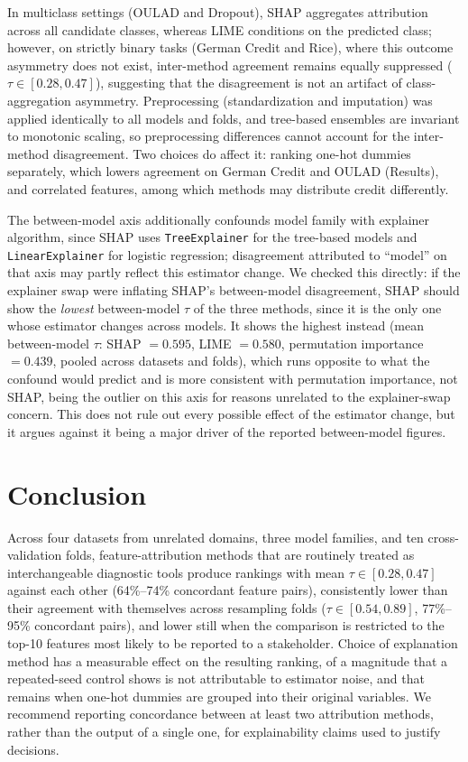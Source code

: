 \documentclass[11pt,twoside,a4paper]{article}
\begin{document}
In multiclass settings (OULAD and Dropout), SHAP aggregates attribution across all candidate classes, whereas LIME conditions on the predicted class; however, on strictly binary tasks (German Credit and Rice), where this outcome asymmetry does not exist, inter-method agreement remains equally suppressed ($\tau \in [0.28, 0.47]$), suggesting that the disagreement is not an artifact of class-aggregation asymmetry. Preprocessing (standardization and imputation) was applied identically to all models and folds, and tree-based ensembles are invariant to monotonic scaling, so preprocessing differences cannot account for the inter-method disagreement. Two choices do affect it: ranking one-hot dummies separately, which lowers agreement on German Credit and OULAD (Results), and correlated features, among which methods may distribute credit differently.

The between-model axis additionally confounds model family with explainer algorithm, since SHAP uses \texttt{TreeExplainer} for the tree-based models and \texttt{LinearExplainer} for logistic regression; disagreement attributed to ``model'' on that axis may partly reflect this estimator change. We checked this directly: if the explainer swap were inflating SHAP's between-model disagreement, SHAP should show the \emph{lowest} between-model $\tau$ of the three methods, since it is the only one whose estimator changes across models. It shows the highest instead (mean between-model $\tau$: SHAP $=0.595$, LIME $=0.580$, permutation importance $=0.439$, pooled across datasets and folds), which runs opposite to what the confound would predict and is more consistent with permutation importance, not SHAP, being the outlier on this axis for reasons unrelated to the explainer-swap concern. This does not rule out every possible effect of the estimator change, but it argues against it being a major driver of the reported between-model figures.

\FloatBarrier
\section{Conclusion}

Across four datasets from unrelated domains, three model families, and ten cross-validation folds, feature-attribution methods that are routinely treated as interchangeable diagnostic tools produce rankings with mean $\tau \in [0.28, 0.47]$ against each other (64\%--74\% concordant feature pairs), consistently lower than their agreement with themselves across resampling folds ($\tau \in [0.54, 0.89]$, 77\%--95\% concordant pairs), and lower still when the comparison is restricted to the top-10 features most likely to be reported to a stakeholder. Choice of explanation method has a measurable effect on the resulting ranking, of a magnitude that a repeated-seed control shows is not attributable to estimator noise, and that remains when one-hot dummies are grouped into their original variables. We recommend reporting concordance between at least two attribution methods, rather than the output of a single one, for explainability claims used to justify decisions.
\end{document}
